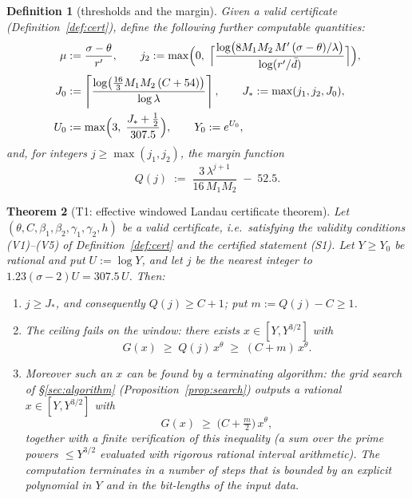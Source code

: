 \documentclass[11pt]{amsart}
\newtheorem{theorem}{Theorem}[section]
\newtheorem{definition}[theorem]{Definition}
\numberwithin{equation}{section}
\newcommand{\Sig}{\sigma}
\newcommand{\dbar}{\bar{d}}
\begin{document}
\begin{definition}[thresholds and the margin]\label{def:thresholds}
Given a valid certificate (Definition~\ref{def:cert}), define the
following further computable quantities:
\begin{align*}
\mu &:= \frac{\Sig-\theta}{r'}, \qquad
j_2 := \max\Bigl(0,\;
\Bigl\lceil \frac{\log\bigl(8 M_1 M_2\, M'\,(\Sig-\theta)/\lambda\bigr)}
{\log(r'/\dbar)} \Bigr\rceil\Bigr),\\
J_0 &:= \left\lceil
\frac{\log\bigl(\tfrac{16}{3} M_1 M_2\, (C + 54)\bigr)}{\log\lambda}
\right\rceil,
\qquad
J_* := \max(j_1, j_2, J_0),\\
U_0 &:= \max\Bigl(3,\; \frac{J_* + \tfrac12}{307.5}\Bigr),
\qquad
Y_0 := e^{U_0},
\end{align*}
and, for integers $j \ge \max(j_1, j_2)$, the \emph{margin function}
\[
Q(j) \;:=\; \frac{3\,\lambda^{j+1}}{16\,M_1 M_2} \;-\; 52.5 .
\]
\end{definition}

\begin{theorem}[T1: effective windowed Landau certificate theorem]
\label{thm:main}
Let
$(\theta, C, \beta_1, \beta_2, \gamma_1, \gamma_2, h)$
be a valid certificate, i.e.\ satisfying the validity conditions
{\rm (V1)--(V5)} of Definition~\ref{def:cert} and the certified
statement {\rm (S1)}. Let $Y \ge Y_0$ be rational and put
$U := \log Y$, and let $j$ be the nearest integer to $1.23(\Sig-2)U
= 307.5\,U$. Then:
\begin{enumerate}
\item $j \ge J_*$, and consequently $Q(j) \ge C + 1$; put
$m := Q(j) - C \ge 1$.
\item The ceiling \emph{fails} on the window: there exists
$x \in [Y, Y^{3/2}]$ with
\[
G(x) \;\ge\; Q(j)\, x^{\theta} \;\ge\; (C + m)\,x^{\theta}.
\]
\item Moreover such an $x$ can be found by a terminating algorithm:
the grid search of \S\ref{sec:algorithm}
(Proposition~\ref{prop:search}) outputs a rational
$x \in [Y, Y^{3/2}]$ with
\[
G(x) \;\ge\; \bigl(C + \tfrac{m}{2}\bigr)\,x^{\theta},
\]
together with a finite verification of this inequality (a sum over
the prime powers $\le Y^{3/2}$ evaluated with rigorous rational
interval arithmetic). The computation terminates in a number of
steps that is bounded by an explicit polynomial in $Y$ and in the
bit-lengths of the input data.
\end{enumerate}
\end{theorem}
\end{document}
